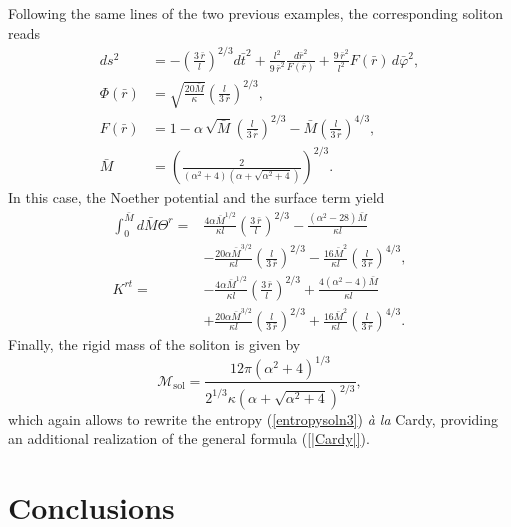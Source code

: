\documentclass[prd,twocolumn,superscriptaddress,amsmath,amssymb,nofootinbib]{revtex4-1}
\begin{document}
Following the same lines of the two previous examples, the
corresponding soliton reads
\begin{subequations}\label{soliton3}
\begin{align}
ds^2&=-\left(\frac{3\,\bar{r}}{l}\right)^{2/3} d\bar{t}^2
+\frac{l^2}{9\,\bar{r}^2}\frac{d\bar{r}^2}{F(\bar{r})}
+ \frac{9\,\bar{r}^2}{l^{2}}F(\bar{r})\,d\bar{\varphi}^2,\\
\Phi(\bar{r})&=\sqrt{\frac{20\bar{M}}{\kappa}}\left(\frac{l}{3\,\bar{r}}\right)^{2/3},\\
F(\bar{r})&=1-\alpha\,\sqrt{\bar{M}}\left(\frac{l}{3\,\bar{r}}\right)^{2/3}
-\bar{M}\left(\frac{l}{3\,\bar{r}}\right)^{4/3},\\
\bar{M}&=\left(\frac2{(\alpha^2+4)\left(\alpha+\sqrt{\alpha^2+4}\right)}\right)^{2/3}.
\end{align}
\end{subequations}
In this case, the Noether potential and the surface term yield
\begin{align*}
\int_{0}^{\bar{M}}\!\!\!\!d\bar{M}\Theta^{r}={}&
\frac{4\alpha\bar{M}^{1/2}}{{\kappa}l}
\left(\frac{3\,\bar{r}}{l}\right)^{2/3}
-\frac{(\alpha^2-28)\bar{M}}{{\kappa}l}\\
&-\frac{20\alpha\bar{M}^{3/2}}{{\kappa}l}
\left(\frac{l}{3\,\bar{r}}\right)^{2/3}
-\frac{16\bar{M}^{2}}{{\kappa}l}
\left(\frac{l}{3\,\bar{r}}\right)^{4/3},\nonumber\\
K^{rt}={}&-\frac{4\alpha\bar{M}^{1/2}}{{\kappa}l}
\left(\frac{3\,\bar{r}}{l}\right)^{2/3}
+\frac{4(\alpha^2-4)\bar{M}}{{\kappa}l}\\
&+\frac{20\alpha\bar{M}^{3/2}}{{\kappa}l}
\left(\frac{l}{3\,\bar{r}}\right)^{2/3}
+\frac{16\bar{M}^{2}}{{\kappa}l}
\left(\frac{l}{3\,\bar{r}}\right)^{4/3}.
\end{align*}%
Finally, the rigid mass of the soliton is given by
\begin{equation}\label{massolsol3}
\mathcal{M}_{\mathrm{sol}}=\frac{12\pi(\alpha^2+4)^{1/3}}
{2^{1/3}\kappa\left(\alpha+\sqrt{\alpha^2+4}\right)^{2/3}},
\end{equation}
which again allows to rewrite the entropy (\ref{entropysoln3})
\emph{\`a la} Cardy, providing an additional realization of the
general formula (\ref{|Cardy|}).

\section{Conclusions}
\end{document}
